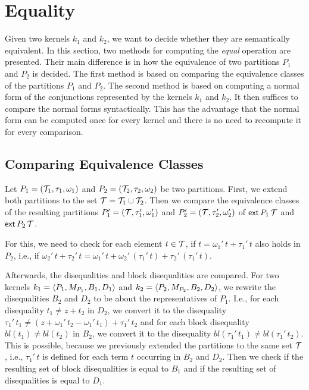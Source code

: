 \section{Equality}

Given two kernels $k_1$ and $k_2$, we want to decide whether they are semantically equivalent.
In this section, two methods for computing the \emph{equal} operation are presented.
Their main difference is in how the equivalence of two partitions $P_1$ and $P_2$ is decided.
The first method is based on comparing the equivalence classes of the partitions $P_1$ and $P_2$.
The second method is based on computing a normal form of the conjunctions represented by the kernels $k_1$ and $k_2$.
It then suffices to compare the normal forms syntactically. This has the advantage that the normal form can be computed once
for every kernel and there is no need to recompute it for every comparison.

\subsection{Comparing Equivalence Classes}

Let $P_1 = (\mathcal{T}_1, \tau_1, \omega_1)$ and $P_2 = (\mathcal{T}_2, \tau_2, \omega_2)$ be two partitions.
First, we extend both partitions to the set $\mathcal{T} = \mathcal{T}_1 \cup \mathcal{T}_2$.
Then we compare the equivalence classes of the resulting partitions $P_1' = (\mathcal{T}, \tau_1', \omega_1')$ and $P_2' = (\mathcal{T}, \tau_2', \omega_2')$ of $\textsf{ext}\,{P_1}\,{\mathcal{T}}$ and $\textsf{ext}\,{P_2}\,{\mathcal{T}}$.

For this, we need to check for each element $t \in \mathcal{T}$, if $t = \omega_1'\,t + \tau_1'\,t$ also holds in $P_2$, i.e.,
if $\omega_2'\,t + \tau_2'\,t = \omega_1'\,t + \omega_2'\,(\tau_1'\,t) + \tau_2'\,(\tau_1'\,t)$.

Afterwards, the disequalities and block disequalities are compared.
For two kernels $k_1 = \langle P_1, M_{P_1}, B_1, D_1\rangle$ and $k_2 = \langle P_2, M_{P_2}, B_2, D_2\rangle$,
we rewrite the disequalities $B_2$ and $D_2$ to be about the representatives of $P_1$.
I.e., for each disequality $t_1 \neq z + t_2$ in $D_2$, we convert it to the disequality $\tau_1'\,t_1 \neq (z + \omega_1'\,t_2 - \omega_1'\,t_1) + \tau_1'\,t_2$
and for each block disequality $bl(t_1) \neq bl(t_2)$ in $B_2$, we convert it to the disequality $bl(\tau_1'\,t_1) \neq bl(\tau_1'\,t_2)$.
This is possible, because we previously extended the partitions to the same set $\mathcal{T}$,
i.e., $\tau_1'\,t$ is defined for each term $t$ occurring in $B_2$ and $D_2$.
Then we check if the resulting set of block disequalities is equal to $B_1$ and if the resulting set of disequalities is equal to $D_1$.

